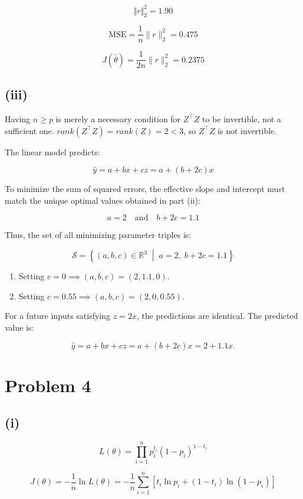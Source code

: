 \documentclass[11pt]{article}
\begin{document}
$$
\Vert r \Vert_2^2 = 1.90
$$

$$
\text{MSE} = \frac{1}{n} \|r\|_2^2 = 0.475
$$

$$    
J(\hat{\theta}) = \frac{1}{2n} \|r\|_2^2 = 0.2375
$$

\subsection*{(iii)}

Having $n \ge p$ is merely a necessary condition for $Z^\top Z$ to be invertible, not a sufficient one. $rank(Z^\top Z) = rank(Z) = 2 < 3$, so $Z^\top Z$ is not invertible.

The linear model predicts:

$$
\hat{y} = a + bx + cz = a + (b + 2c)x
$$

To minimize the sum of squared errors, the effective slope and intercept must match the unique optimal values obtained in part (ii):

$$
a = 2 \quad \text{and} \quad b + 2c = 1.1
$$

Thus, the set of all minimizing parameter triples is:

$$
\mathcal{S} = \left\{ (a, b, c) \in \mathbb{R}^3 \;\middle|\; a = 2, \; b + 2c = 1.1 \right\}
$$

\begin{enumerate}
    \item Setting $c = 0 \implies (a, b, c) = (2, 1.1, 0)$.
    \item Setting $c = 0.55 \implies (a, b, c) = (2, 0, 0.55)$.
\end{enumerate}

For a future inputs satisfying $z = 2x$, the predictions are identical. The predicted value is:

$$
\hat{y} = a + bx + cz = a + (b + 2c)x = 2 + 1.1x.
$$

\newpage

\section*{Problem 4}

\subsection*{(i)}

$$
L(\theta) = \prod_{i=1}^n p_i^{t_i} (1 - p_i)^{1 - t_i}
$$

$$
J(\theta)
= -\frac{1}{n} \ln L(\theta)
= -\frac{1}{n} \sum_{i=1}^n \left[ t_i \ln p_i + (1 - t_i) \ln(1 - p_i) \right]
$$
\end{document}
